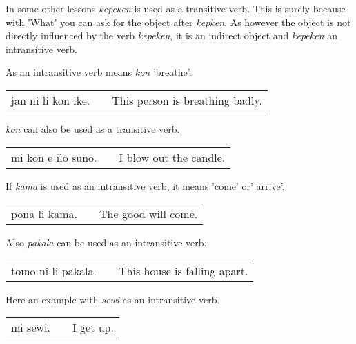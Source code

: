 In some other lessons \textit{kepeken} is used as a transitive verb.
This is surely because with 'What' you can ask for the object after \textit{kepken}. 
As however the object is not directly influenced by the verb \textit{kepeken}, it is an indirect object and \textit{kepeken} an intransitive verb. 

%
As an intransitive verb means \textit{kon} 'breathe'.

\begin{supertabular}{p{5,5cm}|ll}
jan ni li kon ike. && This person is breathing badly. \\
\end{supertabular}

\textit{kon} can also be used as a transitive verb. 

\begin{supertabular}{p{5,5cm}|ll}
mi kon e ilo suno. && I blow out the candle. \\
\end{supertabular}

%
If \textit{kama} is used as an intransitive verb, it means 'come' or' arrive'.

\begin{supertabular}{p{5,5cm}|ll}
pona li kama. && The good will come. \\
\end{supertabular}

%
Also \textit{pakala} can be used as an intransitive verb. 

\begin{supertabular}{p{5,5cm}|ll}
tomo ni li pakala. && This house is falling apart. \\	
\end{supertabular}

%
Here an example with \textit{sewi} as an intransitive verb. 

\begin{supertabular}{p{5,5cm}|ll}
mi sewi. &&  I get up. \\	
\end{supertabular}

